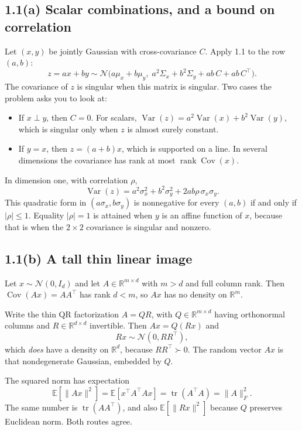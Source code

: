 \documentclass[11pt]{article}
\theoremstyle{remark}
\newcommand{\E}{\mathbb{E}}
\newcommand{\R}{\mathbb{R}}
\newcommand{\Var}{\operatorname{Var}}
\newcommand{\Cov}{\operatorname{Cov}}
\newcommand{\tr}{\operatorname{tr}}
\newcommand{\N}{\mathcal{N}}
\begin{document}
\subsection*{1.1(a) Scalar combinations, and a bound on correlation}

Let \((x,y)\) be jointly Gaussian with cross-covariance \(C\). Apply 1.1 to the row \((a,b)\):
\[
z=ax+by\sim\N\big(a\mu_x+b\mu_y,\;
a^2\Sigma_x+b^2\Sigma_y+ab\,C+ab\,C^\top\big).
\]
The covariance of \(z\) is singular when this matrix is singular. Two cases the problem asks you to look at:
\begin{itemize}
\item If \(x\perp y\), then \(C=0\). For scalars, \(\Var(z)=a^2\Var(x)+b^2\Var(y)\), which is singular only when \(z\) is almost surely constant.
\item If \(y=x\), then \(z=(a+b)x\), which is supported on a line. In several dimensions the covariance has rank at most \(\operatorname{rank}\Cov(x)\).
\end{itemize}
In dimension one, with correlation \(\rho\),
\[
\Var(z)=a^2\sigma_x^2+b^2\sigma_y^2+2ab\rho\,\sigma_x\sigma_y.
\]
This quadratic form in \((a\sigma_x,b\sigma_y)\) is nonnegative for every \((a,b)\) if and only if \(|\rho|\le 1\). Equality \(|\rho|=1\) is attained when \(y\) is an affine function of \(x\), because that is when the \(2\times 2\) covariance is singular and nonzero.

\subsection*{1.1(b) A tall thin linear image}

Let \(x\sim\N(0,I_d)\) and let \(A\in\R^{m\times d}\) with \(m>d\) and full column rank. Then \(\Cov(Ax)=AA^\top\) has rank \(d<m\), so \(Ax\) has no density on \(\R^m\).

Write the thin QR factorization \(A=QR\), with \(Q\in\R^{m\times d}\) having orthonormal columns and \(R\in\R^{d\times d}\) invertible. Then \(Ax=Q(Rx)\) and
\[
Rx\sim\N(0,RR^\top),
\]
which \emph{does} have a density on \(\R^d\), because \(RR^\top\succ 0\). The random vector \(Ax\) is that nondegenerate Gaussian, embedded by \(Q\).

The squared norm has expectation
\[
\E[\lVert Ax\rVert^2]
=\E[x^\top A^\top A x]
=\tr(A^\top A)
=\lVert A\rVert_F^2.
\]
The same number is \(\tr(AA^\top)\), and also \(\E[\lVert Rx\rVert^2]\) because \(Q\) preserves Euclidean norm. Both routes agree.
\end{document}
